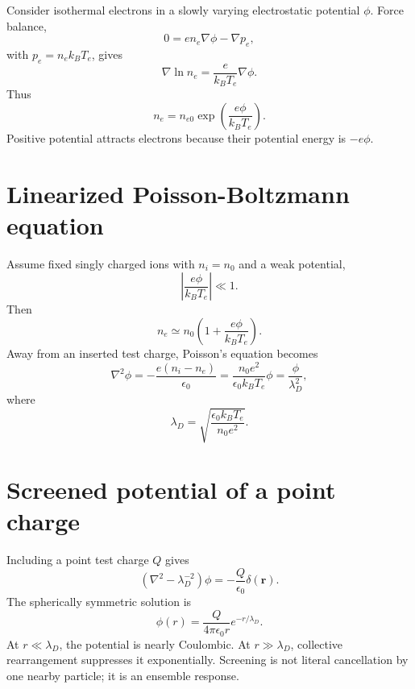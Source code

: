 \documentclass[11pt]{article}
\begin{document}
Consider isothermal electrons in a slowly varying electrostatic potential $\phi$. Force balance,
\begin{equation}
0=en_e\nabla\phi-\nabla p_e,
\end{equation}
with $p_e=n_ek_BT_e$, gives
\begin{equation}
\nabla\ln n_e=\frac{e}{k_BT_e}\nabla\phi.
\end{equation}
Thus
\begin{equation}
n_e=n_{e0}\exp\left(\frac{e\phi}{k_BT_e}\right).
\end{equation}
Positive potential attracts electrons because their potential energy is $-e\phi$.


\section{Linearized Poisson-Boltzmann equation}

Assume fixed singly charged ions with $n_i=n_0$ and a weak potential,
\begin{equation}
\left|\frac{e\phi}{k_BT_e}\right|\ll1.
\end{equation}
Then
\begin{equation}
n_e\simeq n_0\left(1+\frac{e\phi}{k_BT_e}\right).
\end{equation}
Away from an inserted test charge, Poisson's equation becomes
\begin{equation}
\nabla^2\phi=-\frac{e(n_i-n_e)}{\epsilon_0}
=\frac{n_0e^2}{\epsilon_0k_BT_e}\phi
=\frac{\phi}{\lambda_D^2},
\end{equation}
where
\begin{equation}
\boxed{\lambda_D=\sqrt{\frac{\epsilon_0k_BT_e}{n_0e^2}}}.
\end{equation}


\section{Screened potential of a point charge}

Including a point test charge $Q$ gives
\begin{equation}
\left(\nabla^2-\lambda_D^{-2}\right)\phi
=-\frac{Q}{\epsilon_0}\delta(\mathbf r).
\end{equation}
The spherically symmetric solution is
\begin{equation}
\boxed{\phi(r)=\frac{Q}{4\pi\epsilon_0r}e^{-r/\lambda_D}}.
\end{equation}
At $r\ll\lambda_D$, the potential is nearly Coulombic. At $r\gg\lambda_D$, collective rearrangement suppresses it exponentially. Screening is not literal cancellation by one nearby particle; it is an ensemble response.
\end{document}
